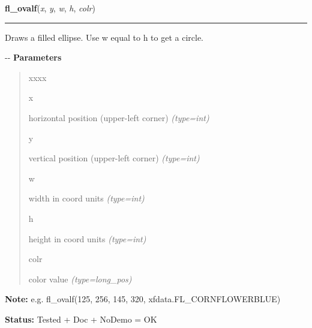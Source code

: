 \hspace{.8\funcindent}\begin{boxedminipage}{\funcwidth}

    \raggedright \textbf{fl\_ovalf}(\textit{x}, \textit{y}, \textit{w}, \textit{h}, \textit{colr})

    \vspace{-1.5ex}

    \rule{\textwidth}{0.5\fboxrule}
\setlength{\parskip}{2ex}

Draws a filled ellipse. Use w equal to h to get a circle.

-{}-
\setlength{\parskip}{1ex}
      \textbf{Parameters}
      \vspace{-1ex}

      \begin{quote}
        \begin{Ventry}{xxxx}

          \item[x]


horizontal position (upper-left corner)
            {\it (type=int)}

          \item[y]


vertical position (upper-left corner)
            {\it (type=int)}

          \item[w]


width in coord units
            {\it (type=int)}

          \item[h]


height in coord units
            {\it (type=int)}

          \item[colr]


color value
            {\it (type=long\_pos)}

        \end{Ventry}

      \end{quote}

\textbf{Note:} 
e.g. fl\_ovalf(125, 256, 145, 320, xfdata.FL\_CORNFLOWERBLUE)


\textbf{Status:} 
Tested + Doc + NoDemo = OK


    \end{boxedminipage}

    \label{xformslib:flxbasic:fl_ovall}

